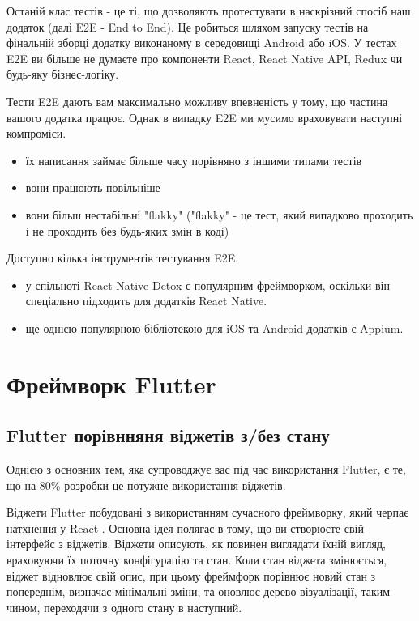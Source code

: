 Останій клас тестів - це ті, що дозволяють протестувати в наскрізний спосіб наш додаток (далі E2E - End to End).
Це робиться шляхом запуску тестів на фінальній зборці додатку виконаному в середовищі Android або iOS.
У тестах E2E ви більше не думаєте про компоненти React, React Native API, Redux чи будь-яку бізнес-логіку.

Тести E2E дають вам максимально можливу впевненість у тому, що частина вашого додатка працює.
Однак в випадку E2E ми мусимо враховувати наступні компроміси.

\begin{itemize}
    \item їх написання займає більше часу порівняно з іншими типами тестів
    \item вони працюють повільніше
    \item вони більш нестабільні "flakky" ("flakky"  - це тест, який випадково проходить і не проходить без будь-яких змін в коді)
\end{itemize}

Доступно кілька інструментів тестування E2E.
\begin{itemize}
    \item у спільноті React Native Detox є популярним фреймворком, оскільки він спеціально підходить для додатків React Native.\cite{detox_home_page}
    \item ще однією популярною бібліотекою для iOS та Android додатків є Appium.\cite{appium_home_page}
\end{itemize}


\section{Фреймворк Flutter}
\label{sec:flutter}

\subsection{Flutter порівнняня віджетів з/без стану}
\label{subsec:flutter_widgets_theory}
Однією з основних тем, яка супроводжує вас під час використання Flutter, є те, що на 80\% розробки це потужне використання віджетів.

Віджети Flutter побудовані з використанням сучасного фреймворку, який черпає натхнення у React \cite{flutter_widgets_intro}.
Основна ідея полягає в тому, що ви створюєте свій інтерфейс з віджетів.
Віджети описують, як повинен виглядати їхній вигляд, враховуючи їх поточну конфігурацію та стан.
Коли стан віджета змінюється, віджет відновлює свій опис, при цьому фреймфорк порівнює новий стан з попереднім,
визначає мінімальні зміни, та оновлює дерево візуалізації, таким чином, переходячи з одного стану в наступний.

